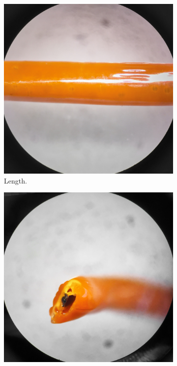 \begin{figure}[t]
        \centering
        \begin{subfigure}[b]{0.4\linewidth}
                \includegraphics[width=\linewidth]{./figures/filament-108-40-dip-side}
                \caption{Length.}
                \label{fig:filament-108-40-dip-side}
        \end{subfigure}
        \begin{subfigure}[b]{0.4\linewidth}
                \includegraphics[width=\linewidth]{./figures/filament-108-40-dip-end}

\end{subfigure}
\end{figure}
